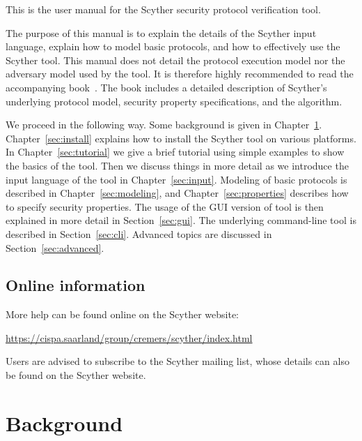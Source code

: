 \documentclass{book}
\begin{document}
\bigskip

\noindent
This is the user manual for the Scyther security protocol verification
tool.

The purpose of this manual is to explain the
details of the Scyther input language, explain how to model basic
protocols, and how to effectively use the Scyther tool.
This manual does not detail the protocol execution model nor
the adversary model used by the tool. It is therefore highly recommended to read the
accompanying book~\cite{opsembook}. The book includes a detailed
description of Scyther's
underlying protocol model, security property specifications, and the
algorithm.

We proceed in the following way. Some background is given in
Chapter~\ref{sec:background}. 
Chapter~\ref{sec:install} explains how to install the Scyther tool on
various platforms. In Chapter~\ref{sec:tutorial} we give a brief
tutorial using simple examples to show the basics of the tool.
Then we discuss things in more detail as we introduce the input language
of the tool in Chapter~\ref{sec:input}. Modeling of basic protocols is
described in Chapter~\ref{sec:modeling}, and
Chapter~\ref{sec:properties} describes how to specify security
properties. The usage of the GUI version of tool
is then explained in more detail in Section~\ref{sec:gui}. The
underlying command-line tool is described in Section~\ref{sec:cli}.
Advanced topics are discussed
in Section~\ref{sec:advanced}.

\section*{Online information}

More help can be found online on the Scyther website:

\medskip
\url{https://cispa.saarland/group/cremers/scyther/index.html}
\medskip

\noindent
Users are advised to subscribe to the Scyther mailing list,
whose details can also be found on the Scyther website.

\chapter{Background}
\label{sec:background}
\end{document}
